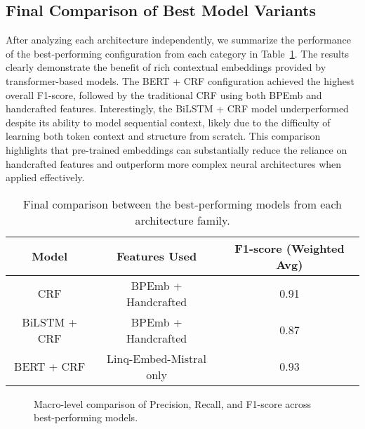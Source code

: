 \subsection{Final Comparison of Best Model Variants}
\label{subsec:final_comparison}
After analyzing each architecture independently, we summarize the performance of the best-performing configuration from each category in Table~\ref{tab:final_model_comparison}. The results clearly demonstrate the benefit of rich contextual embeddings provided by transformer-based models. The BERT + CRF configuration achieved the highest overall F1-score, followed by the traditional CRF using both BPEmb and handcrafted features. Interestingly, the BiLSTM + CRF model underperformed despite its ability to model sequential context, likely due to the difficulty of learning both token context and structure from scratch. This comparison highlights that pre-trained embeddings can substantially reduce the reliance on handcrafted features and outperform more complex neural architectures when applied effectively.
\begin{table}[h]
    \centering
    \begin{tabular}{|c|c|c|}
    \hline
    \textbf{Model} & \textbf{Features Used} & \textbf{F1-score (Weighted Avg)} \\
    \hline
    CRF            & BPEmb + Handcrafted     & 0.91 \\
    BiLSTM + CRF   & BPEmb + Handcrafted     & 0.87 \\
    BERT + CRF     & Linq-Embed-Mistral only & 0.93 \\
    \hline
    \end{tabular}
    \caption{Final comparison between the best-performing models from each architecture family.}
    \label{tab:final_model_comparison}
\end{table}

\begin{figure}[H]
    \centering
    
    \caption{Macro-level comparison of Precision, Recall, and F1-score across best-performing models.}
    \label{fig:model_comparison_chart}
\end{figure}


